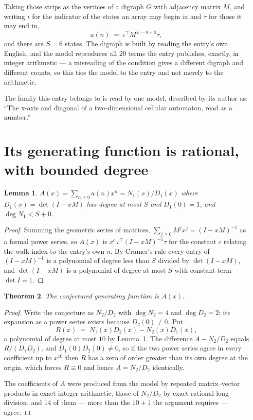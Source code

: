 \documentclass[11pt,a4paper]{article}
\theoremstyle{plain}
\newtheorem{theorem}{Theorem}
\newtheorem{lemma}[theorem]{Lemma}
\theoremstyle{definition}
\begin{document}
Taking those strips as the vertices of a digraph $G$ with adjacency matrix $M$, and writing
$\iota$ for the indicator of the states an array may begin in and $\tau$ for those it may end
in,
\[
a(n)\;=\;\iota^{\!\top}M^{\,n-0+0}\tau ,
\]
and there are $S=6$ states. The digraph is built by reading the entry's own English, and the
model reproduces all $20$ terms the entry publishes, exactly, in integer arithmetic --- a
misreading of the condition gives a different digraph and different counts, so this ties the
model to the entry and not merely to the arithmetic.

The family this entry belongs to is read by one model, described by its author as: ``The x-axis and diagonal of a two-dimensional cellular automaton, read as a number.''


\section{Its generating function is rational, with bounded degree}

\begin{lemma}\label{lem:rat}
$A(x)=\sum_{n\ge0}a(n)x^n=N_1(x)/D_1(x)$ where $D_1(x)=\det(I-xM)$ has degree at most
$S$ and $D_1(0)=1$, and $\deg N_1<S+0$.
\end{lemma}

\begin{proof}
Summing the geometric series of matrices, $\sum_{j\ge0}M^jx^j=(I-xM)^{-1}$ as a formal
power series, so $A(x)$ is $x^{c}\,\iota^{\!\top}(I-xM)^{-1}\tau$ for the constant $c$
relating the walk index to the entry's own $n$. By Cramer's rule every entry of
$(I-xM)^{-1}$ is a polynomial of degree less than $S$ divided by $\det(I-xM)$, and
$\det(I-xM)$ is a polynomial of degree at most $S$ with constant term $\det I=1$.
\end{proof}

\begin{theorem}
The conjectured generating function is $A(x)$.
\end{theorem}

\begin{proof}
Write the conjecture as $N_2/D_2$ with $\deg N_2=4$ and $\deg D_2=2$; its expansion as a
power series exists because $D_2(0)\neq0$. Put
\[
R(x)\;=\;N_1(x)D_2(x)-N_2(x)D_1(x),
\]
a polynomial of degree at most $10$ by Lemma~\ref{lem:rat}. The difference
$A-N_2/D_2$ equals $R/(D_1D_2)$, and $D_1(0)D_2(0)\neq0$, so if the two power series agree in
every coefficient up to $x^{10}$ then $R$ has a zero of order greater than its own
degree at the origin, which forces $R\equiv0$ and hence $A=N_2/D_2$ identically.

The coefficients of $A$ were produced from the model by repeated matrix--vector products in
exact integer arithmetic, those of $N_2/D_2$ by exact rational long division, and $14$
of them --- more than the $10+1$ the argument requires --- agree.
\end{proof}
\end{document}
